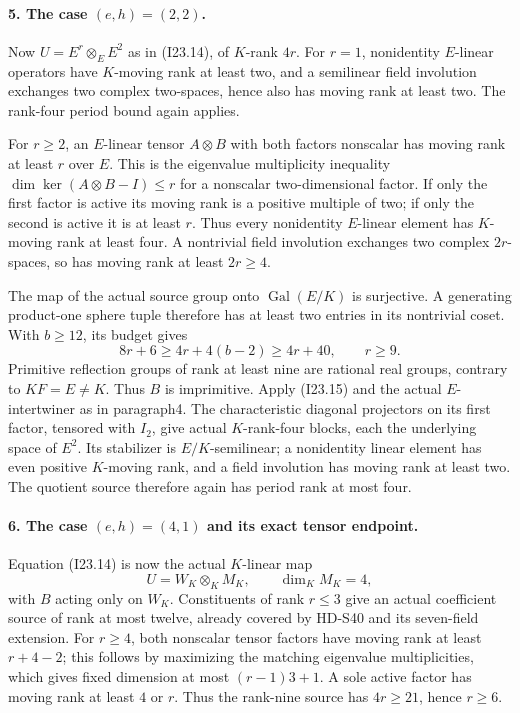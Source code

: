 \paragraph{5. The case \((e,h)=(2,2)\).}
Now \(U=E^r\otimes_E E^2\) as in (I23.14), of \(K\)-rank
\(4r\). For \(r=1\), nonidentity \(E\)-linear operators have
\(K\)-moving rank at least two, and a semilinear field involution
exchanges two complex two-spaces, hence also has moving rank at
least two. The rank-four period bound again applies.

For \(r\ge2\), an \(E\)-linear tensor \(A\otimes B\)
with both factors nonscalar has moving rank at least \(r\)
over \(E\). This is the eigenvalue multiplicity inequality
\(\dim\ker(A\otimes B-I)\le r\) for a nonscalar
two-dimensional factor. If only the first factor is active its
moving rank is a positive multiple of two; if only the second
is active it is at least \(r\). Thus every nonidentity
\(E\)-linear element has \(K\)-moving rank at least four.
A nontrivial field involution exchanges two complex \(2r\)-spaces,
so has moving rank at least \(2r\ge4\).

The map of the actual source group onto \(\operatorname{Gal}(E/K)\)
is surjective. A generating product-one sphere tuple therefore
has at least two entries in its nontrivial coset. With \(b\ge12\),
its budget gives
\[
                    8r+6\ge4r+4(b-2)\ge4r+40,
                    \qquad r\ge9.                         \tag{I23.16}
\]
Primitive reflection groups of rank at least nine are rational
real groups, contrary to \(KF=E\ne K\). Thus \(B\) is
imprimitive. Apply (I23.15) and the actual \(E\)-intertwiner
as in paragraph4. The characteristic diagonal projectors on
its first factor, tensored with \(I_2\), give actual
\(K\)-rank-four blocks, each the underlying space of \(E^2\).
Its stabilizer is \(E/K\)-semilinear; a nonidentity linear
element has even positive \(K\)-moving rank, and a field
involution has moving rank at least two. The quotient source
therefore again has period rank at most four.

\paragraph{6. The case \((e,h)=(4,1)\) and its exact tensor endpoint.}
Equation (I23.14) is now the actual \(K\)-linear map
\[
                  U=W_K\otimes_K M_K,\qquad \dim_K M_K=4,
                                                               \tag{I23.17}
\]
with \(B\) acting only on \(W_K\). Constituents of rank
\(r\le3\) give an actual coefficient source of rank at most
twelve, already covered by HD-S40 and its seven-field extension.
For \(r\ge4\), both nonscalar tensor factors have moving rank
at least \(r+4-2\); this follows by maximizing the matching
eigenvalue multiplicities, which gives fixed dimension at most
\((r-1)3+1\). A sole active factor has moving rank at least
\(4\) or \(r\). Thus the rank-nine source has
\(4r\ge21\), hence \(r\ge6\).

